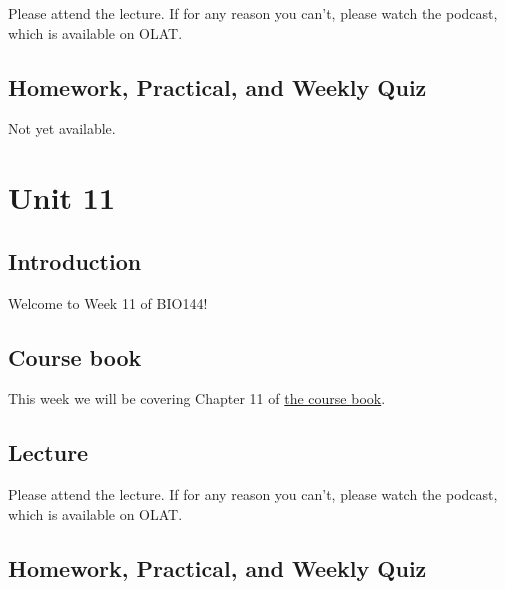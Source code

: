 \documentclass[
  letterpaper,
  8pt,
  a4paper]{book}
\begin{document}

Please attend the lecture. If for any reason you can't, please watch the
podcast, which is available on OLAT.

\section*{Homework, Practical, and Weekly
Quiz}\label{homework-practical-and-weekly-quiz-9}


Not yet available.


\chapter*{Unit 11}\label{unit-11}


\section*{Introduction}\label{introduction-11}


Welcome to Week 11 of BIO144!

\section*{Course book}\label{course-book-10}


This week we will be covering Chapter 11 of
\href{https://opetchey.github.io/BIO144_Course_Book/}{the course book}.

\section*{Lecture}\label{lecture-10}


Please attend the lecture. If for any reason you can't, please watch the
podcast, which is available on OLAT.

\section*{Homework, Practical, and Weekly
Quiz}\label{homework-practical-and-weekly-quiz-10}
\end{document}
